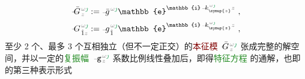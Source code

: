 \begin{subequations} \label{eq:polar_phase}
\begin{align}
	\Xint{\mathcolor{gray}{-}}{20}{\bar{G}}^{\;\!\mathcolor{gray}{\omega} \textcolor{ForestGreen}{\jmath}}_{\;\! \mathcolor{gray}{z}} &:= \Xint{{}^{}_{\mathcolor{gray}{-}}}{10}{\bar{g}}^{\;\!\mathcolor{gray}{\omega} \textcolor{ForestGreen}{\jmath}} \mathbb{e}^{\mathbb{i} \Xint{\begin{smallmatrix} ~ \\ {}^{}_{\mathcolor{gray}{-}} \\ ~ \end{smallmatrix}}{15}{k}_{\symup{z}}^{\;\! \mathcolor{gray}{\omega} \textcolor{ForestGreen}{\jmath}} \mathcolor{gray}{z}} ~, \label{eq:vec-polar_phase} \\
	\Xint{\mathcolor{gray}{-}}{20}{G}^{\;\!\mathcolor{gray}{\omega} \textcolor{ForestGreen}{\jmath}}_{\;\! \hat{1} \mathcolor{gray}{z}} &:= \Xint{{}^{}_{\mathcolor{gray}{-}}}{10}{g}^{\;\!\mathcolor{gray}{\omega} \textcolor{ForestGreen}{\jmath}}_{\;\! \hat{1}} \mathbb{e}^{\mathbb{i} \Xint{\begin{smallmatrix} ~ \\ {}^{}_{\mathcolor{gray}{-}} \\ ~ \end{smallmatrix}}{15}{k}_{\symup{z}}^{\;\! \mathcolor{gray}{\omega} \textcolor{ForestGreen}{\jmath}} \mathcolor{gray}{z}} ~, \label{eq:components-polar_phase}
\end{align}
\end{subequations}
至少 2 个、最多 3 个互相独立（但不一定正交）的\textcolor{Maroon}{本征模} $\Xint{\mathcolor{gray}{-}}{20}{\bar{G}}^{\;\!\mathcolor{gray}{\omega} \textcolor{ForestGreen}{\jmath}}_{\;\! \mathcolor{gray}{z}}$ 张成完整的解空间，并以一定的\textcolor{ForestGreen}{复振幅} $\Xint{\begin{smallmatrix} ~ \\ {}^{}_{\mathcolor{gray}{-}} \\ ~ \end{smallmatrix}}{09}{\mathtt{g}}^{\;\!\mathcolor{gray}{\omega} \textcolor{ForestGreen}{\jmath}}_{\;\! \mathcolor{gray}{z}}$ 系数比例线性叠加后，即得\textcolor{ForestGreen}{特征方程}  的通解，也即  的第三种表示形式
